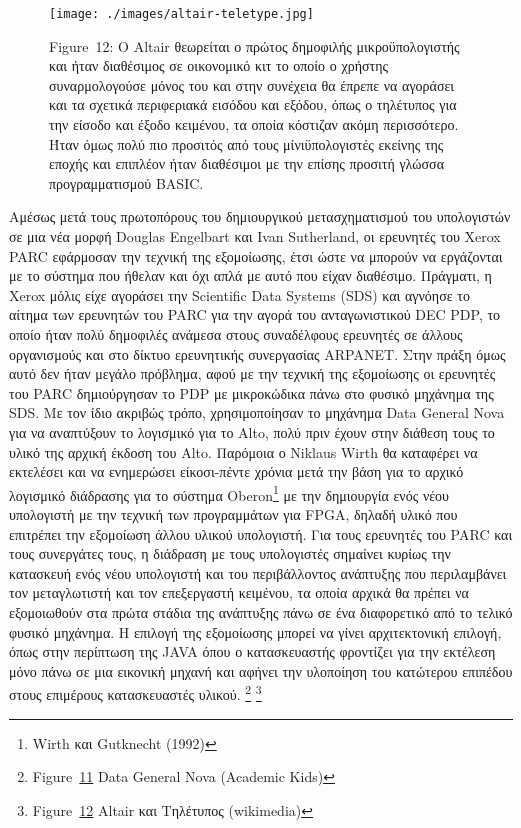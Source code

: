 \documentclass[
]{article}
\begin{document}
\leavevmode{}%
\begin{figure}
\hypertarget{fig:altair-teletype}{%
\centering
\texttt{[image: ./images/altair-teletype.jpg]}
\caption{Figure~12: O Altair θεωρείται ο πρώτος δημοφιλής
μικροϋπολογιστής και ήταν διαθέσιμος σε οικονομικό κιτ το οποίο ο
χρήστης συναρμολογούσε μόνος του και στην συνέχεια θα έπρεπε να αγοράσει
και τα σχετικά περιφεριακά εισόδου και εξόδου, όπως ο τηλέτυπος για την
είσοδο και έξοδο κειμένου, τα οποία κόστιζαν ακόμη περισσότερο. Ήταν
όμως πολύ πιο προσιτός από τους μίνιϋπολογιστές εκείνης της εποχής και
επιπλέον ήταν διαθέσιμοι με την επίσης προσιτή γλώσσα προγραμματισμού
BASIC.}\label{fig:altair-teletype}
}
\end{figure}

Αμέσως μετά τους πρωτοπόρους του δημιουργικού μετασχηματισμού του
υπολογιστών σε μια νέα μορφή Douglas Engelbart και Ivan Sutherland, οι
ερευνητές του Xerox PARC εφάρμοσαν την τεχνική της εξομοίωσης, έτσι ώστε
να μπορούν να εργάζονται με το σύστημα που ήθελαν και όχι απλά με αυτό
που είχαν διαθέσιμο. Πράγματι, η Xerox μόλις είχε αγοράσει την
Scientific Data Systems (SDS) και αγνόησε το αίτημα των ερευνητών του
PARC για την αγορά του ανταγωνιστικού DEC PDP, το οποίο ήταν πολύ
δημοφιλές ανάμεσα στους συναδέλφους ερευνητές σε άλλους οργανισμούς και
στο δίκτυο ερευνητικής συνεργασίας ARPANET. Στην πράξη όμως αυτό δεν
ήταν μεγάλο πρόβλημα, αφού με την τεχνική της εξομοίωσης οι ερευνητές
του PARC δημιούργησαν το PDP με μικροκώδικα πάνω στο φυσικό μηχάνημα της
SDS. Με τον ίδιο ακριβώς τρόπο, χρησιμοποίησαν το μηχάνημα Data General
Nova για να αναπτύξουν το λογισμικό για το Alto, πολύ πριν έχουν στην
διάθεση τους το υλικό της αρχική έκδοση του Alto. Παρόμοια ο Niklaus
Wirth θα καταφέρει να εκτελέσει και να ενημερώσει είκοσι-πέντε χρόνια
μετά την βάση για το αρχικό λογισμικό διάδρασης για το σύστημα
Oberon\footnote{Wirth και Gutknecht (1992)} με την δημιουργία ενός νέου
υπολογιστή με την τεχνική των προγραμμάτων για FPGA, δηλαδή υλικό που
επιτρέπει την εξομοίωση άλλου υλικού υπολογιστή. Για τους ερευνητές του
PARC και τους συνεργάτες τους, η διάδραση με τους υπολογιστές σημαίνει
κυρίως την κατασκευή ενός νέου υπολογιστή και του περιβάλλοντος
ανάπτυξης που περιλαμβάνει τον μεταγλωτιστή και τον επεξεργαστή
κειμένου, τα οποία αρχικά θα πρέπει να εξομοιωθούν στα πρώτα στάδια της
ανάπτυξης πάνω σε ένα διαφορετικό από το τελικό φυσικό μηχάνημα. Η
επιλογή της εξομοίωσης μπορεί να γίνει αρχιτεκτονική επιλογή, όπως στην
περίπτωση της JAVA όπου ο κατασκευαστής φροντίζει για την εκτέλεση μόνο
πάνω σε μια εικονική μηχανή και αφήνει την υλοποίηση του κατώτερου
επιπέδου στους επιμέρους κατασκευαστές υλικού. \footnote{Figure~\protect\hyperlink{fig:nova}{11}
  Data General Nova (Academic Kids)} \footnote{Figure~\protect\hyperlink{fig:altair-teletype}{12}
  Altair και Τηλέτυπος (wikimedia)}
\end{document}
